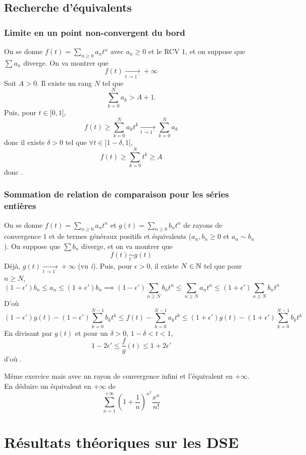 \subsection{Recherche d'équivalents}

\subsubsection{Limite en un point non-convergent du bord}

On se donne $f(t)=\sum_{n\geq 0}a_nt^n$ avec $a_n\geq 0$ et le RCV $1$, et on suppose que $\sum a_n$ diverge. On va montrer que \[
    f(t)\xrightarrow[t\to1^-]{}+\infty
\]
Soit $A>0$. Il existe un rang $N$ tel que \[
    \sum_{k=0}^Na_k>A+1.
\]
Puis, pour $t\in [0, 1[$, \[
    f(t)\geq \sum_{k=0}^Na_kt^k\xrightarrow[t\to1^-]{}\sum_{k=0}^Na_k
\]
donc il existe $\delta>0$ tel que $\forall t\in ]1-\delta, 1[$, \[
    f(t)\geq \sum_{k=0}^Nt^k\geq A
\]
donc \conc.

\subsubsection{Sommation de relation de comparaison pour les séries entières}

On se donne $f(t)=\sum_{n\geq 0}a_nt^n$ et $g(t)=\sum_{n\geq 0}b_nt^n$ de rayons de convergence $1$ et de termes généraux positifs et équivalents ($a_n,b_n\geq 0$ et $a_n\sim b_n$). On suppose que $\sum b_n$ diverge, et on va montrer que \[
    f(t)\underset{1^-}\sim g(t)
\]
Déjà, $g(t)\xrightarrow[t\to1^-]{}+\infty$ (vu \emph i). Puis, pour $\epsilon>0$, il existe $N\in\mathbb N$ tel que pour $n\geq N$, \[
    (1-\epsilon')b_n\leq a_n\leq (1+\epsilon')b_n \implies (1-\epsilon')\sum_{n\geq N}b_nt^n\leq \sum_{n\geq N}a_nt^n\leq(1+\epsilon')\sum_{n\geq N}b_nt^n
\]
D'où \[
    (1-\epsilon')g(t)-(1-\epsilon')\sum_{k=0}^{N-1}b_kt^k\leq f(t)-\sum_{k=0}^{N-1}a_kt^k\leq (1+\epsilon')g(t)-(1+\epsilon')\sum_{k=0}^{N-1}b_kt^k
\]
En divisant par $g(t)$ et pour un $\delta>0$, $1-\delta<t<1$, \[
    1-2\epsilon'\leq \frac fg(t)\leq 1+2\epsilon'
\]
d'où \conc.

\begin{exo}
    Même exercice mais avec un rayon de convergence infini et l'équivalent en $+\infty$. En déduire un équivalent en $+\infty$ de \[
        \sum_{n=1}^{+\infty} \left( 1+ \frac{1}{n} \right)^{n^2}\frac{x^n}{n!}
    \]
\end{exo}

\section{Résultats théoriques sur les DSE}

